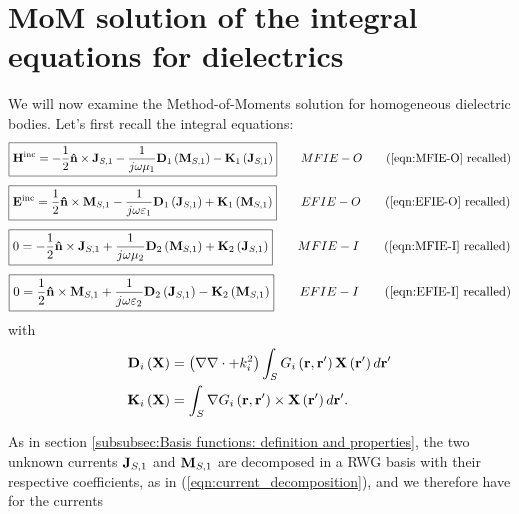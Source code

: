 \chapter{MoM solution of the integral equations for dielectrics}
%
\par
We will now examine the Method-of-Moments solution for homogeneous dielectric bodies. Let's first recall the integral equations:
\begin{equation*}
\boxed{
\field{H}^\text{inc} = - \frac{1}{2} \vect{\hat{n}} \times \current{J}_{S,1} - \frac{1}{j \omega \mu_1} \operator{D}_1 \left( \current{M}_{S,1}\right) - \operator{K}_1 \left(\current{J}_{S,1}\right)
} \qquad MFIE-O \tag{\ref{eqn:MFIE-O} recalled}
\end{equation*}
\begin{equation*}
\boxed{
\field{E}^\text{inc} =  \frac{1}{2} \vect{\hat{n}} \times \current{M}_{S,1} - \frac{1}{j \omega \varepsilon_1} \operator{D}_1 \left( \current{J}_{S,1}\right) + \operator{K}_1 \left(\current{M}_{S,1}\right)
} \qquad EFIE-O \tag{\ref{eqn:EFIE-O} recalled}
\end{equation*}
\begin{equation*}
\boxed{
0 = - \frac{1}{2} \vect{\hat{n}} \times \current{J}_{S,1} + \frac{1}{j \omega \mu_2} \operator{D}_2\left(\current{M}_{S,1}\right) +  \operator{K}_2\left( \current{J}_{S,1}\right)
} \qquad MFIE-I \tag{\ref{eqn:MFIE-I} recalled}
\end{equation*}
\begin{equation*}
\boxed{
0 = \frac{1}{2} \vect{\hat{n}} \times \current{M}_{S,1} + \frac{1}{j \omega \varepsilon_2} \operator{D}_2\left(\current{J}_{S,1}\right) -  \operator{K}_2\left( \current{M}_{S,1}\right)
} \qquad EFIE-I \tag{\ref{eqn:EFIE-I} recalled}
\end{equation*}
with
\begin{align*}
\mathbf{D}_i\left(\mathbf{X}\right) &= \left(\nabla \nabla \cdot + k_i^2\right) \int_{S} G_i\left(\mathbf{r}, \mathbf{r}'\right) \mathbf{X}\left(\mathbf{r}'\right) d\mathbf{r}' \\
\mathbf{K}_i\left(\mathbf{X}\right) &= \int_S \nabla G_i\left(\mathbf{r}, \mathbf{r}'\right) \times \mathbf{X}\left(\mathbf{r}'\right) d\mathbf{r}'.
\end{align*}
%
\par
As in section \ref{subsubsec:Basis functions: definition and properties}, the two unknown currents $\mathbf{J}_{S, 1}$ and $\mathbf{M}_{S, 1}$ are decomposed in a RWG basis with their respective coefficients, as in (\ref{eqn:current_decomposition}), and we therefore have for the currents 
